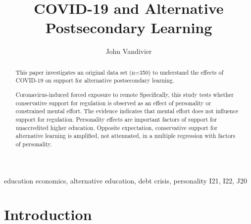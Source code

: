 \documentclass[review]{elsarticle}
\begin{document}
\begin{frontmatter}

    \title{
        COVID-19 and Alternative Postsecondary Learning
    }

    \author[mymainaddress]{John Vandivier}
    \address[mymainaddress]{4400 University Dr, Fairfax, VA 22030}

    \begin{abstract}
        This paper investigates an original data set (n=350) to understand
        the effects of COVID-19
        on support for alternative postsecondary learning.

        Coronavirus-induced forced exposure to remote
        Specifically, this study tests whether conservative support for regulation
        is observed as an effect of personality or constrained mental effort.
        The evidence indicates that mental effort does not influence support for regulation.
        Personality effects are important factors of support for unaccredited higher education.
        Opposite expectation,
        conservative support for alternative learning is amplified,
        not attenuated,
        in a multiple regression with factors of personality.
    \end{abstract}

    \begin{keyword}
        education economics, alternative education, debt crisis, personality    %
        \MSC[2010] I21, I22, J20 %
    \end{keyword}

\end{frontmatter}

\pagebreak
\linenumbers

\section{Introduction}
\end{document}
